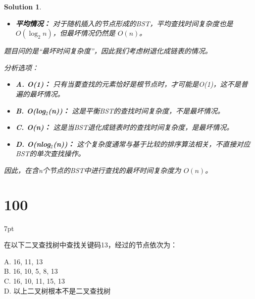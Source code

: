 \documentclass[UTF8]{report}
\newtheorem{solution}{Solution}
\theoremstyle{MyLineTheoremStyle} %
\theoremstyle{MyBlockTheoremStyle} %
\theoremstyle{MySubsubsectionStyle} %
\newenvironment{graybox}{%
        \def\FrameCommand{%
        \hspace{1pt}%
        {\color{gray}\small \vrule width 2pt}%
        {\color{graybox_color}\vrule width 4pt}%
        \colorbox{graybox_color}%
        }%
        \MakeFramed{\advance\hsize-\width\FrameRestore}%
        \noindent\hspace{-4.55pt}%
        \begin{adjustwidth}{}{7pt}%
        \vspace{2pt}\vspace{2pt}%
        }
        {%
        \vspace{2pt}\end{adjustwidth}\endMakeFramed%
        }
\begin{document}
\begin{solution}
\begin{itemize}
    \item \textbf{平均情况：} 对于随机插入的节点形成的BST，平均查找时间复杂度也是 $O(\log_2 n)$，但最坏情况仍然是 $O(n)$。
\end{itemize}

题目问的是“最坏时间复杂度”，因此我们考虑树退化成链表的情况。

分析选项：
\begin{itemize}
    \item \textbf{A. O(1)：} 只有当要查找的元素恰好是根节点时，才可能是O(1)，这不是普遍的最坏情况。
    \item \textbf{B. O(log$_{2}$(n))：} 这是平衡BST的查找时间复杂度，不是最坏情况。
    \item \textbf{C. O(n)：} 这是当BST退化成链表时的查找时间复杂度，是最坏情况。
    \item \textbf{D. O(nlog$_{2}$(n))：} 这个复杂度通常与基于比较的排序算法相关，不直接对应BST的单次查找操作。
\end{itemize}

因此，在含n个节点的BST中进行查找的最坏时间复杂度为 $O(n)$。
\end{solution}



\section*{100}
\begin{graybox}
在以下二叉查找树中查找关键码13，经过的节点依次为：

A. 16, 11, 13 \\
B. 16, 10, 5, 8, 13 \\
C. 16, 10, 11, 15, 13 \\
D. 以上二叉树根本不是二叉查找树
\end{graybox}
\end{document}
